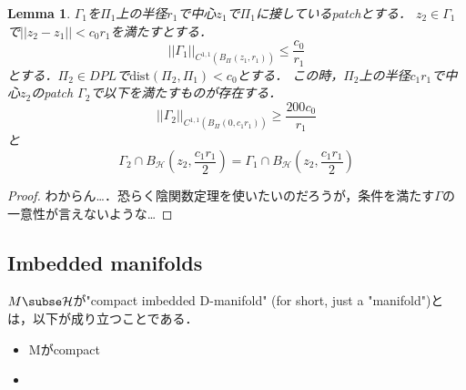 \documentclass{ujarticle}
\newtheorem{lem}[thm]{Lemma}
\newcommand{\bh}[2]{B_{\mathcal{H}}(#1,#2)}
\newcommand{\bp}[3]{B_{\Pi_{#3}}(#1,#2)}
\newcommand{\gn}[4]{||\Gamma_{#1}||_{C^{1,1}(\bp{#2}{#3}{#4})}}
\newcommand{\gnaaad}{||\Gamma_1||_{C^{1,1}(\bp{z_1}{r_1}{})}}
\begin{document}
\begin{lem}
  $\Gamma_1$を$\Pi_1$上の半径$r_1$で中心$z_1$で$\Pi_1$に接しているpatchとする．
  $z_2 \in \Gamma_1$で$||z_2 -z_1 || < c_0r_1$を満たすとする．
  \begin{equation*}
   \gnaaad \le \frac{c_0}{r_1}
  \end{equation*}
  とする．$\Pi_2 \in DPL$で$\mathrm{dist}(\Pi_2,\Pi_1) <c_0$とする．
  この時，$\Pi_2$上の半径$c_1r_1$で中心$z_2$のpatch $\Gamma_2$で以下を満たすものが存在する．
  \begin{equation*}
   \gn{2}{0}{c_1r_1}{} \ge \frac{200c_0}{r_1}
  \end{equation*}
と
\begin{equation*}
\Gamma_2 \cap \bh{z_2}{\frac{c_1r_1}{2}} = \Gamma_1 \cap \bh{z_2}{\frac{c_1r_1}{2}}
\end{equation*}
\end{lem}

\begin{proof}
 わからん…．恐らく陰関数定理を使いたいのだろうが，条件を満たす$\Gamma$の一意性が言えないような…
\end{proof}

\subsection{Imbedded manifolds}
\label{sub:Imbedded manifolds}
$M \subse \mathcal{H}$が"compact imbedded D-manifold" (for short, just a "manifold")とは，以下が成り立つことである．
\begin{itemize}
  \item Mがcompact
  \item
\end{itemize}
\end{document}
